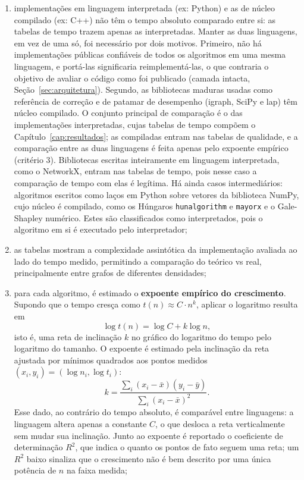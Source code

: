 \begin{enumerate}
    \item implementações em linguagem interpretada (ex: Python) e as de núcleo compilado (ex: C++) não têm o tempo absoluto comparado entre si: as tabelas de tempo trazem apenas as interpretadas. Manter as duas linguagens, em vez de uma só, foi necessário por dois motivos. Primeiro, não há implementações públicas confiáveis de todos os algoritmos em uma mesma linguagem, e portá-las significaria reimplementá-las, o que contraria o objetivo de avaliar o código como foi publicado (camada intacta, Seção~\ref{sec:arquitetura}). Segundo, as bibliotecas maduras usadas como referência de correção e de patamar de desempenho (igraph, SciPy e lap) têm núcleo compilado. O conjunto principal de comparação é o das implementações interpretadas, cujas tabelas de tempo compõem o Capítulo~\ref{cap:resultados}; as compiladas entram nas tabelas de qualidade, e a comparação entre as duas linguagens é feita apenas pelo expoente empírico (critério 3). Bibliotecas escritas inteiramente em linguagem interpretada, como o NetworkX, entram nas tabelas de tempo, pois nesse caso a comparação de tempo com elas é legítima. Há ainda casos intermediários: algoritmos escritos como laços em Python sobre vetores da biblioteca NumPy, cujo núcleo é compilado, como os Húngaros \texttt{hunalgorithm} e \texttt{mayorx} e o Gale-Shapley numérico. Estes são classificados como interpretados, pois o algoritmo em si é executado pelo interpretador;
    \item as tabelas mostram a complexidade assintótica da implementação avaliada ao lado do tempo medido, permitindo a comparação do teórico vs real, principalmente entre grafos de diferentes densidades;
    \item para cada algoritmo, é estimado o \textbf{expoente empírico do crescimento}. Supondo que o tempo cresça como $t(n) \approx C \cdot n^k$, aplicar o logaritmo resulta em
    \begin{equation}
        \log t(n) = \log C + k \log n,
    \end{equation}
    isto é, uma reta de inclinação $k$ no gráfico do logaritmo do tempo pelo logaritmo do tamanho. O expoente é estimado pela inclinação da reta ajustada por mínimos quadrados aos pontos medidos $(x_i, y_i) = (\log n_i, \log t_i)$:
    \begin{equation}
        k = \frac{\sum_i (x_i - \bar{x})(y_i - \bar{y})}{\sum_i (x_i - \bar{x})^2}.
    \end{equation}
    Esse dado, ao contrário do tempo absoluto, é comparável entre linguagens: a linguagem altera apenas a constante $C$, o que desloca a reta verticalmente sem mudar sua inclinação. Junto ao expoente é reportado o coeficiente de determinação $R^2$, que indica o quanto os pontos de fato seguem uma reta; um $R^2$ baixo sinaliza que o crescimento não é bem descrito por uma única potência de $n$ na faixa medida;

\end{enumerate}
